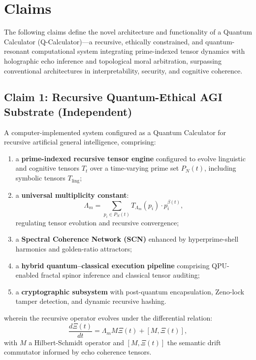 \documentclass[12pt]{article}
\begin{document}
\section{Claims}

The following claims define the novel architecture and functionality of a Quantum Calculator (Q-Calculator)—a recursive, ethically constrained, and quantum-resonant computational system integrating prime-indexed tensor dynamics with holographic echo inference and topological moral arbitration, surpassing conventional architectures in interpretability, security, and cognitive coherence.

\subsection*{Claim 1: Recursive Quantum-Ethical AGI Substrate (Independent)}

A computer-implemented system configured as a Quantum Calculator for recursive artificial general intelligence, comprising:

\begin{enumerate}
    \item a \textbf{prime-indexed recursive tensor engine} configured to evolve linguistic and cognitive tensors \( T_t \) over a time-varying prime set \( P_N(t) \), including symbolic tensors \( T_{\text{ling}} \);

    \item a \textbf{universal multiplicity constant}:
    \[
    \Lambda_m = \sum_{p_i \in P_N(t)} T_{\Lambda_m}(p_i) \cdot p_i^{\beta(t)},
    \]
    regulating tensor evolution and recursive convergence;

    \item a \textbf{Spectral Coherence Network (SCN)} enhanced by hyperprime-shell harmonics and golden-ratio attractors;

    \item a \textbf{hybrid quantum–classical execution pipeline} comprising QPU-enabled fractal spinor inference and classical tensor auditing;

    \item a \textbf{cryptographic subsystem} with post-quantum encapsulation, Zeno-lock tamper detection, and dynamic recursive hashing.
\end{enumerate}

wherein the recursive operator evolves under the differential relation:
\[
\frac{d\Xi(t)}{dt} = \Lambda_m M \Xi(t) + [M, \Xi(t)],
\]
with \( M \) a Hilbert-Schmidt operator and \( [M, \Xi(t)] \) the semantic drift commutator informed by echo coherence tensors.
\end{document}
